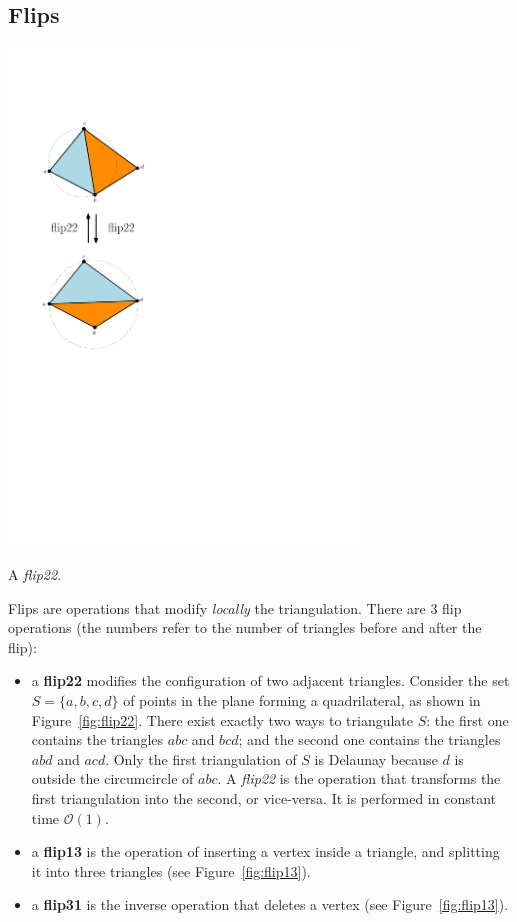 \subsection{Flips}
\begin{marginfigure}
  \centering
  \includegraphics[width=0.7\textwidth]{figs/flip22}
  \caption{A \emph{flip22}.}%
\label{fig:flip22}
\end{marginfigure}
Flips are operations that modify \emph{locally} the triangulation.
There are 3 flip operations (the numbers refer to the number of triangles before and after the flip):
\begin{itemize}
  \item a \textbf{flip22} modifies the configuration of two adjacent triangles. 
  Consider the set $S = \{a, b, c, d\}$ of points in the plane forming a quadrilateral, as shown in Figure~\ref{fig:flip22}. 
  There exist exactly two ways to triangulate $S$: the first one contains the triangles $abc$ and $bcd$; and the second one contains the triangles $abd$ and $acd$. 
  Only the first triangulation of $S$ is Delaunay because $d$ is outside the circumcircle of $abc$. 
  A \emph{flip22} is the operation that transforms the first triangulation into the second, or vice-versa.
  It is performed in constant time $\mathcal{O}(1)$.
  \item a \textbf{flip13} is the operation of inserting a vertex inside a triangle, and splitting it into three triangles (see Figure~\ref{fig:flip13}).
  \item a \textbf{flip31} is the inverse operation that deletes a vertex (see Figure~\ref{fig:flip13}).
\end{itemize}
